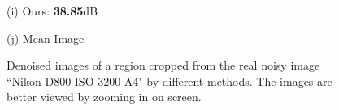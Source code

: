 \documentclass[10pt,onecolumn,letterpaper]{article}
\begin{document}
\begin{figure}[H]
{\begin{minipage}[t]{0.196\textwidth}
{\footnotesize (i) Ours: \textbf{38.85}dB  }
\end{minipage}
\begin{minipage}[t]{0.196\textwidth}
\centering
{}
{\footnotesize (j) Mean Image \cite{crosschannel2016} }
\end{minipage}
}
\caption{Denoised images of a region cropped from the real noisy image ``Nikon D800 ISO 3200 A4" \cite{crosschannel2016} by different methods. The images are better viewed by zooming in on screen.} 
\label{fig19}
\end{figure}
\end{document}

